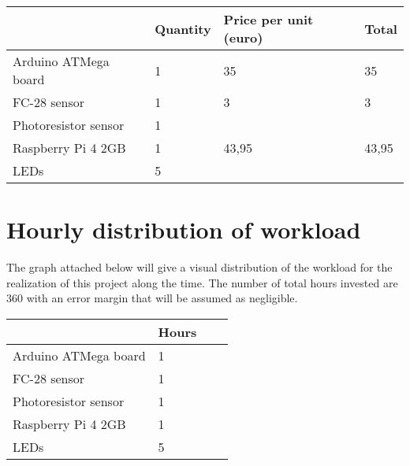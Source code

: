 \begin{table}[]
\begin{tabular}{llll}
\hline
	\color{purple} 
		     & \textbf{Quantity}& \textbf{Price per unit (euro)}& \textbf{Total} \\ \hline
	\color{lightgrey} 
Arduino ATMega board & 1                                        & 35                                                 & 35                                    \\
FC-28 sensor         & 1                                        & 3                                                  & 3                                     \\
	\color{lightgrey} 
Photoresistor sensor & 1                                        &                                                    &                                       \\
Raspberry Pi 4 2GB   & 1                                        & 43,95                                              & 43,95                                 \\
\color{lightgrey} 
LEDs                 & 5                                        &                                                    &                                      
\end{tabular}
\end{table}

\section{Hourly distribution of workload}
The graph attached below will give a visual distribution of the workload for the realization of this project along the time. The number of total hours invested are 360 with an error margin that will be assumed as negligible.

\begin{table}[]
\begin{tabular}{llll}
\hline
        \color{purple}
                     & \textbf{Hours} \\ \hline
        \color{lightgrey}
Arduino ATMega board & 1           \\
FC-28 sensor         & 1           \\
        \color{lightgrey}
Photoresistor sensor & 1           \\
Raspberry Pi 4 2GB   & 1           \\
\color{lightgrey}
LEDs                 & 5           
\end{tabular}
\end{table}


